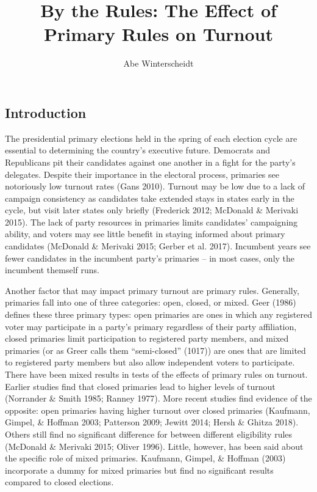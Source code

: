 \documentclass[12pt]{article}
\title{\textbf{By the Rules: The Effect of Primary Rules on Turnout}}
\author{Abe Winterscheidt}
\begin{document}
	\maketitle
	\begin{doublespace}
	\section{Introduction}
	The presidential primary elections held in the spring of each election cycle are essential to determining the country’s executive future. Democrats and Republicans pit their candidates against one another in a fight for the party’s delegates. Despite their importance in the electoral process, primaries see notoriously low turnout rates (Gans 2010). Turnout may be low due to a lack of campaign consistency as candidates take extended stays in states early in the cycle, but visit later states only briefly (Frederick 2012; McDonald \& Merivaki 2015). The lack of party resources in primaries limits candidates’ campaigning ability, and voters may see little benefit in staying informed about primary candidates (McDonald \& Merivaki 2015; Gerber et al. 2017). Incumbent years see fewer candidates in the incumbent party’s primaries – in most cases, only the incumbent themself runs.
\par
	Another factor that may impact primary turnout are primary rules. Generally, primaries fall into one of three categories: open, closed, or mixed. Geer (1986) defines these three primary types: open primaries are ones in which any registered voter may participate in a party’s primary regardless of their party affiliation, closed primaries limit participation to registered party members, and mixed primaries (or as Greer calls them “semi-closed” (1017)) are ones that are limited to registered party members but also allow independent voters to participate. There have been mixed results in tests of the effects of primary rules on turnout. Earlier studies find that closed primaries lead to higher levels of turnout (Norrander \& Smith 1985; Ranney 1977). More recent studies find evidence of the opposite: open primaries having higher turnout over closed primaries (Kaufmann, Gimpel, \& Hoffman 2003; Patterson 2009; Jewitt 2014; Hersh \& Ghitza 2018). Others still find no significant difference for between different eligibility rules (McDonald \& Merivaki 2015; Oliver 1996). Little, however, has been said about the specific role of mixed primaries. Kaufmann, Gimpel, \& Hoffman (2003) incorporate a dummy for mixed primaries but find no significant results compared to closed elections.

\end{doublespace}
\end{document}
